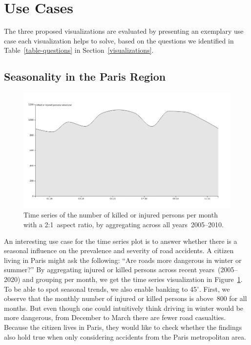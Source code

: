 \section{Use Cases}
The three proposed visualizations are evaluated by presenting an exemplary use case each visualization helps to solve, based on the questions we identified in Table~\ref{table-questions} in Section~\ref{visualizations}.

\subsection{Seasonality in the Paris Region}
\begin{figure}
    \centering
    \includegraphics[width=0.9\linewidth]{figures/time-series-2-to-1-killed-or-injured-absolute-by-year-per-month}
    \caption{Time series of the number of killed or injured persons per month with a 2:1~aspect ratio, by aggregating across all years~2005--2010.}
    \label{figure-time-series-killed-injured-by-year-per-month}
\end{figure}
An interesting use case for the time series plot is to answer whether there is a seasonal influence on the prevalence and severity of road accidents. A citizen living in Paris might ask the following: \enquote{Are roads more dangerous in winter or summer?}
By aggregating injured or killed persons across recent years~(2005--2020) and grouping per month, we get the time series visualization in Figure~\ref{figure-time-series-killed-injured-by-year-per-month}. To be able to spot seasonal trends, we also enable banking to 45\(^\circ\). First, we observe that the monthly number of injured or killed persons is above~800 for all months. But even though one could intuitively think driving in winter would be more dangerous, from December to March there are fewer road casualties.
Because the citizen lives in Paris, they would like to check whether the findings also hold true when only considering accidents from the Paris metropolitan area.
